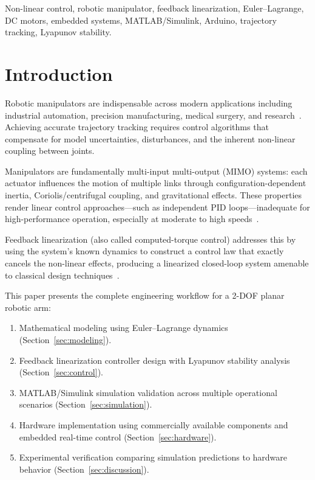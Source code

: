 \documentclass[conference]{IEEEtran}
\begin{document}
\begin{IEEEkeywords}
Non-linear control, robotic manipulator, feedback linearization, Euler--Lagrange, DC motors, embedded systems, MATLAB/Simulink, Arduino, trajectory tracking, Lyapunov stability.
\end{IEEEkeywords}

\section{Introduction}
\label{sec:introduction}

Robotic manipulators are indispensable across modern applications including industrial automation, precision manufacturing, medical surgery, and research~\cite{slotine1991}. Achieving accurate trajectory tracking requires control algorithms that compensate for model uncertainties, disturbances, and the inherent non-linear coupling between joints.

Manipulators are fundamentally multi-input multi-output (MIMO) systems: each actuator influences the motion of multiple links through configuration-dependent inertia, Coriolis/centrifugal coupling, and gravitational effects. These properties render linear control approaches---such as independent PID loops---inadequate for high-performance operation, especially at moderate to high speeds~\cite{spong2020}.

Feedback linearization (also called computed-torque control) addresses this by using the system's known dynamics to construct a control law that exactly cancels the non-linear effects, producing a linearized closed-loop system amenable to classical design techniques~\cite{slotine1991,siciliano2009}.

This paper presents the complete engineering workflow for a 2-DOF planar robotic arm:
\begin{enumerate}
\item Mathematical modeling using Euler--Lagrange dynamics (Section~\ref{sec:modeling}).
\item Feedback linearization controller design with Lyapunov stability analysis (Section~\ref{sec:control}).
\item MATLAB/Simulink simulation validation across multiple operational scenarios (Section~\ref{sec:simulation}).
\item Hardware implementation using commercially available components and embedded real-time control (Section~\ref{sec:hardware}).
\item Experimental verification comparing simulation predictions to hardware behavior (Section~\ref{sec:discussion}).
\end{enumerate}
\end{document}
